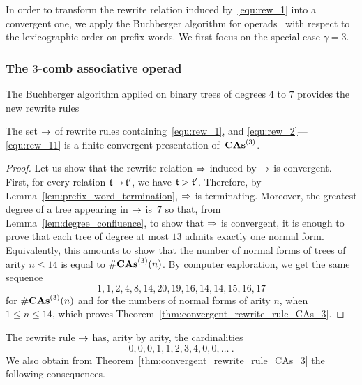 In order to transform the rewrite relation induced by~\eqref{equ:rew_1}
into a convergent one, we apply the Buchberger algorithm for
operads~\cite[Section 3.7]{DK10} with respect to the lexicographic order
on prefix words. We first focus on the special case $\gamma = 3$.
\medbreak

\subsubsection{The \texorpdfstring{$3$}{3}-comb associative operad}
\label{subsubsec:CAs_3}

The Buchberger algorithm applied on binary trees of degrees $4$ to $7$
provides the new rewrite rules \smallbreak

\medbreak

\begin{Theorem} \label{thm:convergent_rewrite_rule_CAs_3}
    The set $\operatorname{\to}$ of rewrite rules containing~\eqref{equ:rew_1},
    and \eqref{equ:rew_2}---\eqref{equ:rew_11} is a finite
    convergent presentation of~$\mathbf{CAs}^{\left(3\right)}$.
\end{Theorem}
\begin{proof}
    Let us show that the rewrite relation $\operatorname{\Rightarrow}$ induced by
    $\operatorname{\to}$ is convergent. First, for every relation $\mathfrak{t} \operatorname{\to} \mathfrak{t}'$,
    we have $\mathfrak{t} > \mathfrak{t}'$. Therefore, by
    Lemma~\ref{lem:prefix_word_termination}, $\operatorname{\Rightarrow}$ is
    terminating. Moreover, the greatest degree of a tree appearing in
    $\operatorname{\to}$ is~$7$ so that, from Lemma~\ref{lem:degree_confluence}, to
    show that $\operatorname{\Rightarrow}$ is convergent, it is enough to prove that
    each tree of degree at most $13$ admits exactly one normal form.
    Equivalently, this amounts to show that the number of normal forms
    of trees of arity $n\leq 14$ is equal to $\#\mathbf{CAs}^{\left(3\right)}(n)$. By computer
    exploration, we get the same sequence
    \begin{equation} \label{equ:dimensions_CAs_3}
        1, 1, 2, 4, 8, 14, 20, 19, 16, 14, 14, 15, 16, 17
    \end{equation}
    for $\#\mathbf{CAs}^{\left(3\right)}(n)$ and for the numbers of normal forms of arity $n$,
    when $ 1 \leq n \leq 14$, which proves
    Theorem~\ref{thm:convergent_rewrite_rule_CAs_3}.
\end{proof}
\medbreak

The rewrite rule $\operatorname{\to}$ has, arity by arity, the cardinalities
\begin{equation}
    0, 0, 0, 1, 1, 2, 3, 4, 0, 0, \dots~.
\end{equation}
We also obtain from Theorem~\ref{thm:convergent_rewrite_rule_CAs_3}
the following consequences.
\medbreak

